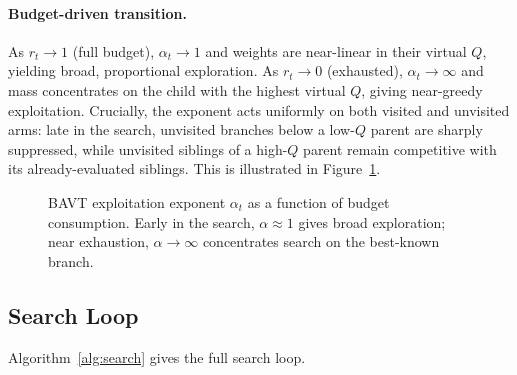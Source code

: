 \documentclass{article}
\begin{document}
\paragraph{Budget-driven transition.}
As $r_t \to 1$ (full budget), $\alpha_t \to 1$ and weights are near-linear in their virtual $Q$, yielding broad, proportional exploration.
As $r_t \to 0$ (exhausted), $\alpha_t \to \infty$ and mass concentrates on the child with the highest virtual $Q$, giving near-greedy exploitation.
Crucially, the exponent acts uniformly on both visited and unvisited arms: late in the search, unvisited branches below a low-$Q$ parent are sharply suppressed, while unvisited siblings of a high-$Q$ parent remain competitive with its already-evaluated siblings.
This is illustrated in Figure~\ref{fig:bavt}.

\begin{figure}[t]
\centering
{}
\caption{BAVT exploitation exponent $\alpha_t$ as a function of budget consumption. Early in the search, $\alpha\approx1$ gives broad exploration; near exhaustion, $\alpha\to\infty$ concentrates search on the best-known branch.}
\label{fig:bavt}
\end{figure}

\subsection{Search Loop}

Algorithm~\ref{alg:search} gives the full search loop.
\end{document}
